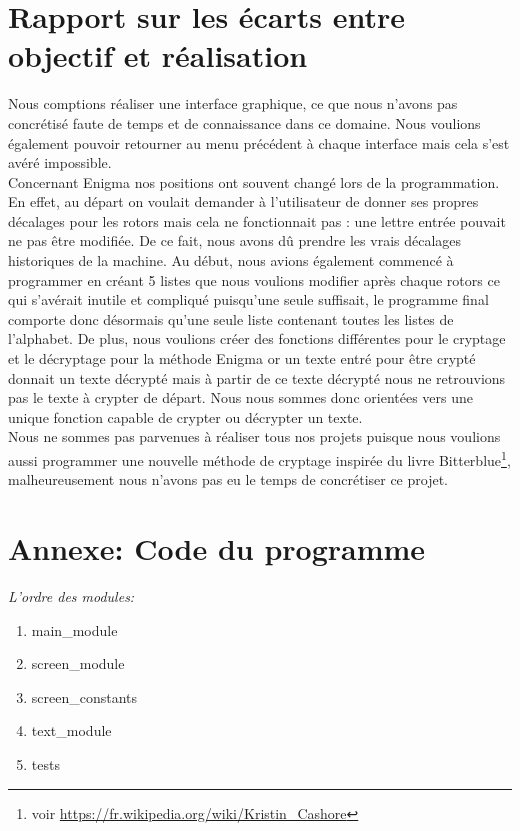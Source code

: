 \documentclass[a4paper,12pt,abstracton,titlepage]{scrartcl}
\begin{document}
{\section{Rapport sur les écarts entre objectif et réalisation}
Nous comptions réaliser une interface graphique, ce que nous n'avons pas concrétisé faute de temps et de connaissance dans ce domaine. Nous voulions également pouvoir retourner au menu précédent à chaque interface mais cela s'est avéré impossible.\\
\noindent\hspace*{3mm}
Concernant Enigma nos positions ont souvent changé lors de la programmation. En effet, au départ on voulait demander à l'utilisateur de donner ses propres décalages pour les rotors mais cela ne fonctionnait pas : une lettre entrée pouvait ne pas être modifiée. De ce fait, nous avons dû prendre les vrais décalages historiques de la machine. Au début, nous avions également commencé à programmer en créant 5 listes que nous voulions modifier après chaque rotors ce qui s'avérait inutile et compliqué puisqu'une seule suffisait, le programme final comporte donc désormais qu'une seule liste contenant toutes les listes de l'alphabet. De plus, nous voulions créer des fonctions différentes pour le cryptage et le décryptage pour la méthode Enigma or un texte entré pour être crypté donnait un texte décrypté mais à partir de ce texte décrypté nous ne retrouvions pas le texte à crypter de départ. Nous nous sommes donc orientées vers une unique fonction capable de crypter ou décrypter un texte.\\
\noindent\hspace*{3mm}
Nous ne sommes pas parvenues à réaliser tous nos projets puisque nous voulions aussi programmer une nouvelle méthode de cryptage inspirée du livre Bitterblue\footnote{voir \url{https://fr.wikipedia.org/wiki/Kristin_Cashore}}, malheureusement nous n'avons pas eu le temps de concrétiser ce projet.
\vspace{1cm}

\section{Annexe: Code du programme}
{\large
\textit{L'ordre des modules:}
\begin{enumerate}
\item main\_module
\item screen\_module
\item screen\_constants
\item text\_module
\item tests
\end{enumerate}
}





}
\end{document}
